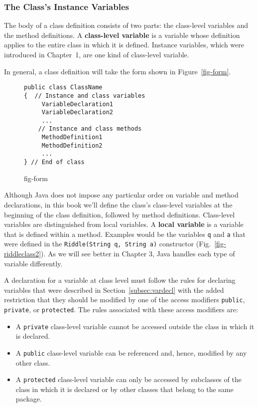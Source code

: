 \subsubsection*{The Class's Instance Variables}

\noindent The body of a class definition consists of
two parts: the class-level variables and the method definitions.  A
{\bf class-level variable} is a variable whose definition applies
to the entire class in which it is defined. Instance variables,
which were introduced in Chapter~1, are one kind of class-level
variable.

In general, a class definition will take the form shown in
Figure~\ref{fig-form}.
\begin{figure}[h!]
\jjjprogstart
\begin{jjjlisting}
\begin{lstlisting}
public class ClassName
{  // Instance and class variables
     VariableDeclaration1
     VariableDeclaration2
     ...
    // Instance and class methods
     MethodDefinition1
     MethodDefinition2
     ...
} // End of class
\end{lstlisting}
\end{jjjlisting}
{fig-form}
\end{figure}


Although Java does not impose any particular order on variable and
method declarations, in this book we'll define the class's class-level
variables at the beginning of the class definition, followed by method
definitions. Class-level variables are distinguished from
local variables. A {\bf local variable} is a variable that is defined
within a method.  Examples would be the variables {\tt q} and {\tt a}
that were defined in the {\tt Riddle(String q, String a)} constructor
(Fig.~\ref{fig-riddleclass2}).  As we will see better in Chapter 3,
Java handles each type of variable differently.

A declaration for a variable at class level must follow the rules for
declaring variables that were described in Section~\ref{subsec:vardecl}
with the added restriction that they should be modified by one of the
access modifiers {\tt public}, {\tt private}, or {\tt protected}.  The
rules associated with these access modifiers are:

\begin{itemize}

\item A {\tt private} class-level variable cannot be accessed outside 
the class in which it is declared.

\item A {\tt public} class-level variable can be referenced and, hence, 
modified by any other class.

\item A {\tt protected} class-level variable can only be accessed 
by subclasses of the class in which it is declared or by other classes
that belong to the same package.

\end{itemize}


